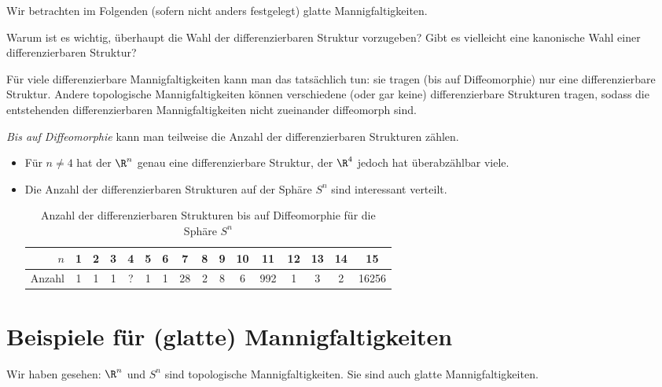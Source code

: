 \begin{conv*}
    Wir betrachten im Folgenden (sofern nicht anders festgelegt) glatte Mannigfaltigkeiten.
\end{conv*}

Warum ist es wichtig, überhaupt die Wahl der differenzierbaren Struktur vorzugeben?
Gibt es vielleicht eine kanonische Wahl einer differenzierbaren Struktur?

Für viele differenzierbare Mannigfaltigkeiten kann man das tatsächlich tun:
sie tragen (bis auf Diffeomorphie) nur eine differenzierbare Struktur.
Andere topologische Mannigfaltigkeiten können verschiedene (oder gar keine) differenzierbare Strukturen tragen, sodass die entstehenden differenzierbaren Mannigfaltigkeiten nicht zueinander diffeomorph sind.

\begin{ex*}
    \emph{Bis auf Diffeomorphie} kann man teilweise die Anzahl der differenzierbaren Strukturen zählen.
    \begin{itemize}
        \item
            Für $n \neq 4$ hat der $\R^n$ genau eine differenzierbare Struktur,
            der $\R^4$ jedoch hat überabzählbar viele.
        \item
            Die Anzahl der differenzierbaren Strukturen auf der Sphäre $S^n$ sind interessant verteilt.
            \begin{table}[ht]
                \begin{tabular}{r|ccccccccccccccc}
                    $n$ & 1 & 2 & 3 & 4 & 5 & 6 & 7 & 8 & 9 & 10 & 11 & 12 & 13 & 14 & 15 \\ \hline
                    Anzahl & 1 & 1 & 1 & ? & 1 & 1 & 28 & 2 & 8 & 6 & 992 & 1 & 3 & 2 & 16256
                \end{tabular}
                \caption{Anzahl der differenzierbaren Strukturen bis auf Diffeomorphie für die Sphäre $S^n$}
            \end{table}
    \end{itemize}
\end{ex*}


\section{Beispiele für (glatte) Mannigfaltigkeiten}


Wir haben gesehen: $\R^n$ und $S^n$ sind topologische Mannigfaltigkeiten.
Sie sind auch glatte Mannigfaltigkeiten.

